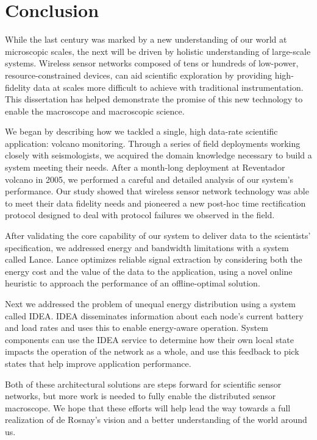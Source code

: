 \chapter{Conclusion}
\label{chapter-conclusion}

While the last century was marked by a new understanding of our world at
microscopic scales, the next will be driven by holistic understanding of
large-scale systems. Wireless sensor networks composed of tens or hundreds
of low-power, resource-constrained devices, can aid scientific exploration by
providing high-fidelity data at scales more difficult to achieve with
traditional instrumentation. This dissertation has helped demonstrate the
promise of this new technology to enable the macroscope and macroscopic
science.

We began by describing how we tackled a single, high data-rate scientific
application: volcano monitoring. Through a series of field deployments
working closely with seismologists, we acquired the domain knowledge
necessary to build a system meeting their needs. After a month-long
deployment at Reventador volcano in 2005, we performed a careful and detailed
analysis of our system's performance. Our study showed that wireless sensor
network technology was able to meet their data fidelity needs and pioneered a
new post-hoc time rectification protocol designed to deal with protocol
failures we observed in the field.

After validating the core capability of our system to deliver data to the
scientists' specification, we addressed energy and bandwidth limitations with
a system called Lance. Lance optimizes reliable signal extraction by
considering both the energy cost and the value of the data to the
application, using a novel online heuristic to approach the performance of an
offline-optimal solution.

Next we addressed the problem of unequal energy distribution using a system
called IDEA. IDEA disseminates information about each node's current battery
and load rates and uses this to enable energy-aware operation. System
components can use the IDEA service to determine how their own local state
impacts the operation of the network as a whole, and use this feedback to
pick states that help improve application performance.

Both of these architectural solutions are steps forward for scientific sensor
networks, but more work is needed to fully enable the distributed sensor
macroscope. We hope that these efforts will help lead the way towards a full
realization of de Rosnay's vision and a better understanding of the world
around us.
